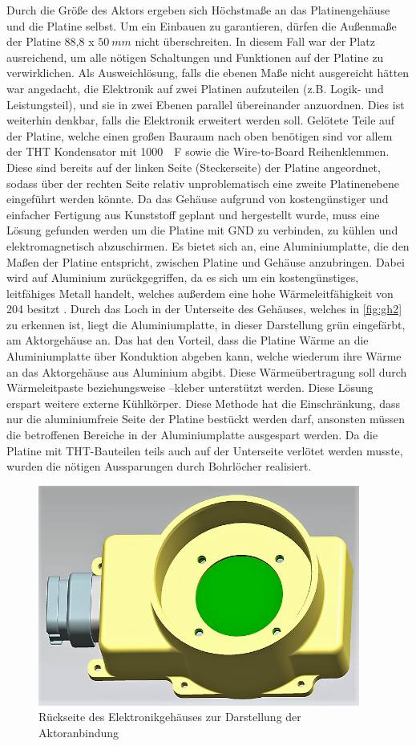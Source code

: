 Durch die Größe des Aktors ergeben sich Höchstmaße an das Platinengehäuse und die Platine selbst. Um ein Einbauen zu garantieren, dürfen die Außenmaße der Platine 88,8 x $\SI{50}{mm}$ nicht überschreiten. In diesem Fall war der Platz ausreichend, um alle nötigen Schaltungen und Funktionen auf der Platine zu verwirklichen. Als Ausweichlösung, falls die ebenen Maße nicht ausgereicht hätten war angedacht, die Elektronik auf zwei Platinen aufzuteilen (z.B. Logik- und Leistungsteil), und sie in zwei Ebenen parallel übereinander anzuordnen. Dies ist weiterhin denkbar, falls die Elektronik erweitert werden soll. Gelötete Teile auf der Platine, welche einen großen Bauraum nach oben benötigen sind vor allem der THT Kondensator mit \SI{1000}{\mu F} sowie die Wire-to-Board Reihenklemmen. Diese sind bereits auf der linken Seite (Steckerseite) der Platine angeordnet, sodass über der rechten Seite relativ unproblematisch eine zweite Platinenebene eingeführt werden könnte.
Da das Gehäuse aufgrund von kostengünstiger und einfacher Fertigung aus Kunststoff geplant und hergestellt wurde, muss eine Lösung gefunden werden um die Platine mit GND zu verbinden, zu kühlen und elektromagnetisch abzuschirmen. Es bietet sich an, eine Aluminiumplatte, die den Maßen der Platine entspricht, zwischen Platine und Gehäuse anzubringen. Dabei wird auf Aluminium zurückgegriffen, da es sich um ein kostengünstiges, leitfähiges Metall handelt, welches außerdem eine hohe Wärmeleitfähigkeit von \SI{204}{} besitzt \cite[S.4]{wuerth}. 
Durch das Loch in der Unterseite des Gehäuses, welches in \autoref{fig:gh2} zu erkennen ist, liegt die Aluminiumplatte, in dieser Darstellung grün eingefärbt, am Aktorgehäuse an. Das hat den Vorteil, dass die Platine Wärme an die Aluminiumplatte über Konduktion abgeben kann, welche wiederum ihre Wärme an das Aktorgehäuse aus Aluminium abgibt. Diese Wärmeübertragung soll durch Wärmeleitpaste beziehungsweise –kleber unterstützt werden. Diese Lösung erspart weitere externe Kühlkörper. Diese Methode hat die Einschränkung, dass nur die aluminiumfreie Seite der Platine bestückt werden darf, ansonsten müssen die betroffenen Bereiche in der Aluminiumplatte ausgespart werden. Da die Platine mit THT-Bauteilen teils auch auf der Unterseite verlötet werden musste, wurden die nötigen Aussparungen durch Bohrlöcher realisiert. 
\begin{figure}[H]%
\centering
\includegraphics[width=300pt]{./Bilder/Elektronik_Gehauese}%
\caption{Rückseite des Elektronikgehäuses zur Darstellung der Aktoranbindung}%
\label{fig:gh2}%
\end{figure}\noindent
